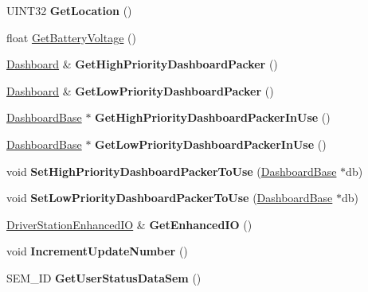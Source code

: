 \begin{DoxyCompactItemize}
\item 
\hypertarget{classDriverStation_a3899bcaedd7a6befed43eb5c036690a1}{\-U\-I\-N\-T32 {\bfseries \-Get\-Location} ()}\label{classDriverStation_a3899bcaedd7a6befed43eb5c036690a1}

\item 
float \hyperlink{classDriverStation_a29be7401b5ccdcf7d86f0cf8030f85bf}{\-Get\-Battery\-Voltage} ()
\item 
\hypertarget{classDriverStation_af5411eeb41793a89b5b9987c00918eae}{\hyperlink{classDashboard}{\-Dashboard} \& {\bfseries \-Get\-High\-Priority\-Dashboard\-Packer} ()}\label{classDriverStation_af5411eeb41793a89b5b9987c00918eae}

\item 
\hypertarget{classDriverStation_ae08099bbd1803e082be3cc9c46155df8}{\hyperlink{classDashboard}{\-Dashboard} \& {\bfseries \-Get\-Low\-Priority\-Dashboard\-Packer} ()}\label{classDriverStation_ae08099bbd1803e082be3cc9c46155df8}

\item 
\hypertarget{classDriverStation_a26ade7bb28ae2e7b71005432ec0e81ca}{\hyperlink{classDashboardBase}{\-Dashboard\-Base} $\ast$ {\bfseries \-Get\-High\-Priority\-Dashboard\-Packer\-In\-Use} ()}\label{classDriverStation_a26ade7bb28ae2e7b71005432ec0e81ca}

\item 
\hypertarget{classDriverStation_a54d39abd25e5213952ea2ae3265bcb55}{\hyperlink{classDashboardBase}{\-Dashboard\-Base} $\ast$ {\bfseries \-Get\-Low\-Priority\-Dashboard\-Packer\-In\-Use} ()}\label{classDriverStation_a54d39abd25e5213952ea2ae3265bcb55}

\item 
\hypertarget{classDriverStation_a656cd215d890fdf28736e950ac664b42}{void {\bfseries \-Set\-High\-Priority\-Dashboard\-Packer\-To\-Use} (\hyperlink{classDashboardBase}{\-Dashboard\-Base} $\ast$db)}\label{classDriverStation_a656cd215d890fdf28736e950ac664b42}

\item 
\hypertarget{classDriverStation_a693f723f6be659c9385fad63c17d157d}{void {\bfseries \-Set\-Low\-Priority\-Dashboard\-Packer\-To\-Use} (\hyperlink{classDashboardBase}{\-Dashboard\-Base} $\ast$db)}\label{classDriverStation_a693f723f6be659c9385fad63c17d157d}

\item 
\hypertarget{classDriverStation_a94c7b5fce697280e73b30dce57bbb917}{\hyperlink{classDriverStationEnhancedIO}{\-Driver\-Station\-Enhanced\-I\-O} \& {\bfseries \-Get\-Enhanced\-I\-O} ()}\label{classDriverStation_a94c7b5fce697280e73b30dce57bbb917}

\item 
\hypertarget{classDriverStation_a6984ff4cb46d315679ace551cb88c875}{void {\bfseries \-Increment\-Update\-Number} ()}\label{classDriverStation_a6984ff4cb46d315679ace551cb88c875}

\item 
\hypertarget{classDriverStation_a95bff259901c96256fa2f9daae5c404a}{\-S\-E\-M\-\_\-\-I\-D {\bfseries \-Get\-User\-Status\-Data\-Sem} ()}\label{classDriverStation_a95bff259901c96256fa2f9daae5c404a}

\end{DoxyCompactItemize}
